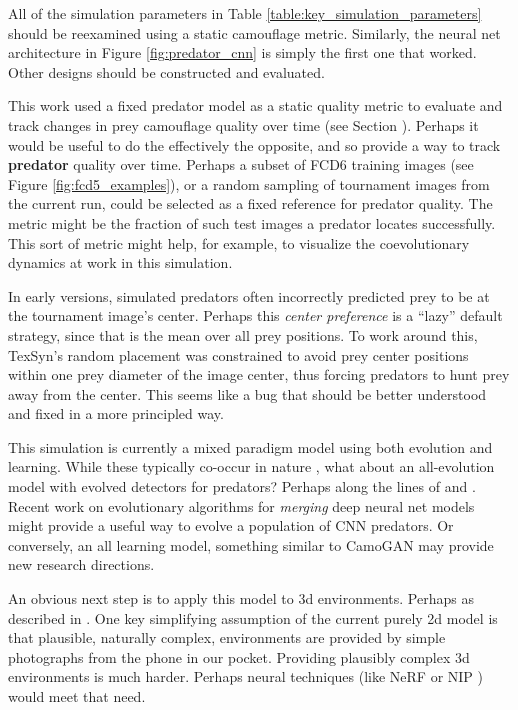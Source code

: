 \documentclass[letterpaper]{article}
\newcommand{\jargon}[1]{\textit{#1}}
\newcommand{\texsyn}[0]{TexSyn}
\begin{document}
\par
All of the simulation parameters in Table \ref{table:key_simulation_parameters} should be reexamined using a static camouflage metric. Similarly, the neural net architecture in Figure \ref{fig:predator_cnn} is simply the first one that worked. Other designs should be constructed and evaluated.
\par
This work used a fixed predator model as a static quality metric to evaluate and track changes in prey camouflage quality over time (see Section ). Perhaps it would be useful to do the effectively the opposite, and so provide a way to track \textbf{predator} quality over time. Perhaps a subset of FCD6 \citep{reynolds_FCD6_2022} training images (see Figure \ref{fig:fcd5_examples}), or a random sampling of tournament images from the current run, could be selected as a fixed reference for predator quality. The metric might be the fraction of such test images a predator locates successfully. This sort of metric might help, for example, to visualize the coevolutionary dynamics at work in this simulation.
\par
In early versions, simulated predators often incorrectly predicted prey to be at the tournament image's center. Perhaps this \jargon{center preference} is a ``lazy'' default strategy, since that is the mean over all prey positions. To work around this, \texsyn{}'s random placement was constrained to avoid prey center positions within one prey diameter of the image center, thus forcing predators to hunt prey away from the center. This seems like a bug that should be better understood and fixed in a more principled way.
\par
This simulation is currently a mixed paradigm model using both evolution and learning. While these typically co-occur in nature \citep{valiant_probably_2013}, what about an all-evolution model with evolved detectors for predators? Perhaps along the lines of \citet{harrington_coevolution_2014} and \citet{bi_genetic_2022}. Recent work on evolutionary algorithms for \jargon{merging} deep neural net models \citep{akiba_evolutionary_2024} might provide a useful way to evolve a population of CNN predators. Or conversely, an all learning model, something similar to CamoGAN \citep{talas_camogan_2020} may provide new research directions.
\par
An obvious next step is to apply this model to 3d environments. Perhaps as described in \citet{miller_color_2022}. One key simplifying assumption of the current purely 2d model is that plausible, naturally complex, environments are provided by simple photographs from the phone in our pocket. Providing plausibly complex 3d environments is much harder. Perhaps neural techniques (like NeRF \citep{gao_nerf_2022} or NIP \citep{sharp_spelunking_2022}) would meet that need.
\par
\end{document}
